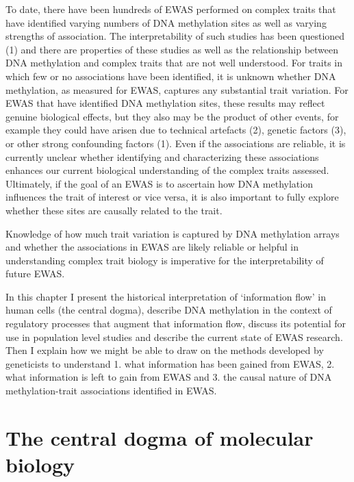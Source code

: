 \documentclass[11pt,oneside]{bristolthesis}
\begin{document}
To date, there have been hundreds of EWAS performed on complex traits that have identified varying numbers of DNA methylation sites as well as varying strengths of association. The interpretability of such studies has been questioned (1) and there are properties of these studies as well as the relationship between DNA methylation and complex traits that are not well understood. For traits in which few or no associations have been identified, it is unknown whether DNA methylation, as measured for EWAS, captures any substantial trait variation. For EWAS that have identified DNA methylation sites, these results may reflect genuine biological effects, but they also may be the product of other events, for example they could have arisen due to technical artefacts (2), genetic factors (3), or other strong confounding factors (1). Even if the associations are reliable, it is currently unclear whether identifying and characterizing these associations enhances our current biological understanding of the complex traits assessed. Ultimately, if the goal of an EWAS is to ascertain how DNA methylation influences the trait of interest or vice versa, it is also important to fully explore whether these sites are causally related to the trait.

Knowledge of how much trait variation is captured by DNA methylation arrays and whether the associations in EWAS are likely reliable or helpful in understanding complex trait biology is imperative for the interpretability of future EWAS.

In this chapter I present the historical interpretation of `information flow' in human cells (the central dogma), describe DNA methylation in the context of regulatory processes that augment that information flow, discuss its potential for use in population level studies and describe the current state of EWAS research. Then I explain how we might be able to draw on the methods developed by geneticists to understand 1. what information has been gained from EWAS, 2. what information is left to gain from EWAS and 3. the causal nature of DNA methylation-trait associations identified in EWAS.

\hypertarget{the-central-dogma-of-molecular-biology}{%
\section{The central dogma of molecular biology}\label{the-central-dogma-of-molecular-biology}}
\end{document}
